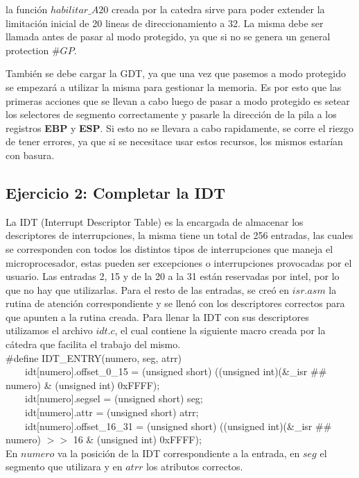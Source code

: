 \documentclass[a4paper,10pt,twoside]{article}
\begin{document}
la función $habilitar\_A20$ creada por la catedra sirve para poder extender la limitación inicial de 20 lineas de direccionamiento a 32. La misma debe ser llamada antes de pasar al modo protegido, ya que si no se genera un general protection $\#GP$.

También se debe cargar la GDT, ya que una vez que pasemos a modo protegido se empezará a utilizar la misma para gestionar la memoria. Es por esto que las primeras acciones que se llevan a cabo luego de pasar a modo protegido es setear los selectores de segmento correctamente y pasarle la dirección de la pila a los registros \textbf{EBP} y \textbf{ESP}. Si esto no se llevara a cabo rapidamente, se corre el riezgo de tener errores, ya que si se necesitace usar estos recursos, los mismos estarían con basura.

\subsection{Ejercicio 2: Completar la IDT}
La IDT (Interrupt Descriptor Table) es la encargada de almacenar los descriptores de interrupciones, la misma tiene un total de 256 entradas, las cuales se corresponden con todos los distintos tipos de interrupciones que maneja el microprocesador, estas pueden ser excepciones o interrupciones provocadas por el usuario. Las entradas 2, 15 y de la 20 a la 31 están reservadas por intel, por lo que no hay que utilizarlas. Para el resto de las entradas, se creó en $isr.asm$ la rutina de atención correspondiente y se llenó con los descriptores correctos para que apunten a la rutina creada.
Para llenar la IDT con sus descriptores utilizamos el archivo $idt.c$, el cual contiene la siguiente macro creada por la cátedra que facilita el trabajo del mismo.\\

\#define IDT\_ENTRY(numero, seg, atrr) \\                                                                      
\ \ \ \ idt[numero].offset\_0\_15 = (unsigned short) ((unsigned int)(\&\_isr \#\# numero) \& (unsigned int) 0xFFFF); \\
\ \ \ \ idt[numero].segsel = (unsigned short) seg; \\
\ \ \ \ idt[numero].attr = (unsigned short) atrr; \\
\ \ \ \ idt[numero].offset\_16\_31 = (unsigned short) ((unsigned int)(\&\_isr \#\# numero) $>>$ 16 \& (unsigned int) 0xFFFF); \\

En $numero$ va la posición de la IDT correspondiente a la entrada, en $seg$ el segmento que utilizara y en $atrr$ los atributos correctos.
\end{document}
